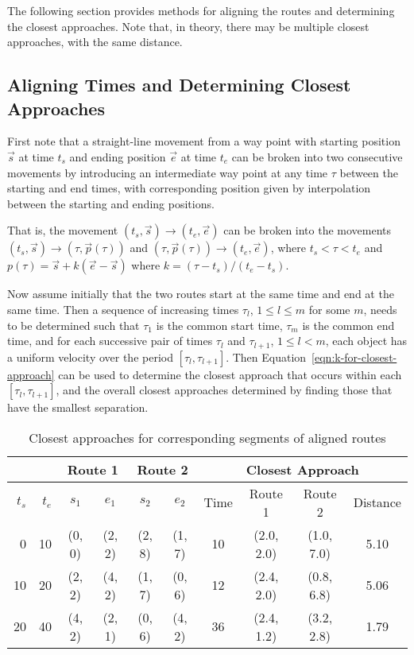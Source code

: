 \documentclass[times,12pt]{article}
\begin{document}
The following section provides methods for aligning the routes and determining the closest approaches. Note that, in theory, there may be multiple closest approaches, with the same distance.

\subsection{Aligning Times and Determining Closest Approaches}
First note that a straight-line movement from a way point with starting position $\vec{s}$ at time $t_s$ and ending position $\vec{e}$ at time $t_e$ can be broken into two consecutive movements by introducing an intermediate way point at any time $\tau$ between the starting and end times, with corresponding position given by interpolation between the starting and ending positions.

That is, the movement $(t_s, \vec{s}) \rightarrow (t_e, \vec{e})$ can be broken into the movements $(t_s, \vec{s}) \rightarrow (\tau, \vec{p}(\tau))$ and $(\tau, \vec{p}(\tau)) \rightarrow (t_e, \vec{e})$, where $t_s < \tau < t_e$ and $p(\tau) = \vec{s} + k(\vec{e} - \vec{s})$ where $k = (\tau - t_s) / (t_e - t_s)$.

Now assume initially that the two routes start at the same time and end at the same time. Then a sequence of increasing times $\tau_l$, $1 \le l \le m$ for some $m$, needs to be determined such that $\tau_1$ is the common start time, $\tau_m$ is the common end time, and for each successive pair of times $\tau_l$ and $\tau_{l+1}$, $1 \le l < m$, each object has a uniform velocity over the period $[\tau_l, \tau_{l+1}]$. Then Equation~\ref{eqn:k-for-closest-approach} can be used to determine the closest approach that occurs within each $[\tau_l, \tau_{l+1}]$, and the overall closest approaches determined by finding those that have the smallest separation.

\begin{table}[htbp]
	\centering
	\begin{tabular}{|r|r||c|c||c|c||c|c|c|c|} \hline
		\multicolumn{2}{|c||}{} & \multicolumn{2}{|c||}{Route 1} & \multicolumn{2}{|c||}{Route 2} & \multicolumn{4}{c|}{Closest Approach} \\ \hline
		$t_s$ & $t_e$ & $s_1$ & $e_1$ & $s_2$ & $e_2$ & Time & Route 1 & Route 2 & Distance \\ \hline
		0 & 10 & (0, 0) & (2, 2) & (2, 8) & (1, 7) & 10 & (2.0, 2.0) & (1.0, 7.0) & 5.10\\
		10 & 20 & (2, 2) & (4, 2) & (1, 7) & (0, 6) & 12 & (2.4, 2.0) & (0.8, 6.8) & 5.06\\
		20 & 40 & (4, 2) & (2, 1) & (0, 6) & (4, 2) & 36 & (2.4, 1.2) & (3.2, 2.8) & 1.79 \\ \hline
	\end{tabular}
\caption{Closest approaches for corresponding segments of aligned routes}
\label{fig:closest-approaches}
\end{table}
\end{document}
